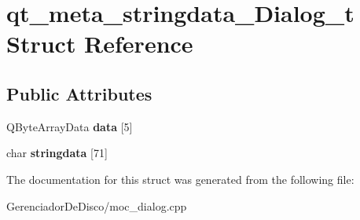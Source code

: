 \hypertarget{structqt__meta__stringdata__Dialog__t}{}\section{qt\+\_\+meta\+\_\+stringdata\+\_\+\+Dialog\+\_\+t Struct Reference}
\label{structqt__meta__stringdata__Dialog__t}
\subsection*{Public Attributes}
\begin{DoxyCompactItemize}
\item 
\hypertarget{structqt__meta__stringdata__Dialog__t_ae8df3bc8b623c73ab4d9b75541fe0ed8}{}Q\+Byte\+Array\+Data {\bfseries data} \mbox{[}5\mbox{]}\label{structqt__meta__stringdata__Dialog__t_ae8df3bc8b623c73ab4d9b75541fe0ed8}

\item 
\hypertarget{structqt__meta__stringdata__Dialog__t_aa3d88739476830b302bbe2887068499e}{}char {\bfseries stringdata} \mbox{[}71\mbox{]}\label{structqt__meta__stringdata__Dialog__t_aa3d88739476830b302bbe2887068499e}

\end{DoxyCompactItemize}


The documentation for this struct was generated from the following file\+:\begin{DoxyCompactItemize}
\item 
Gerenciador\+De\+Disco/moc\+\_\+dialog.\+cpp\end{DoxyCompactItemize}
